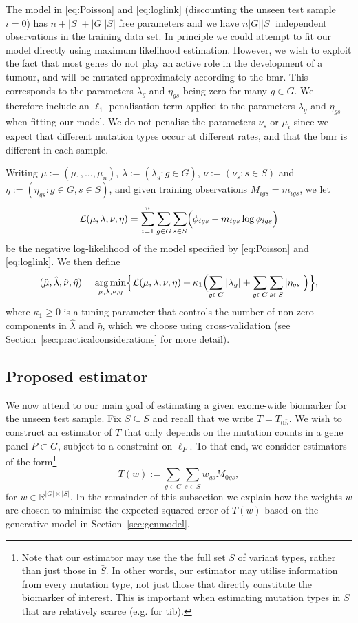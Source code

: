 \documentclass[../thesis.tex]{subfiles}
\begin{document}
The model in \eqref{eq:Poisson} and \eqref{eq:loglink} (discounting the unseen test sample $i=0$) has $n + |S| + |G||S|$ free parameters and we have $n|G||S|$ independent observations in the training data set. In principle we could attempt to fit our model directly using maximum likelihood estimation. However, we wish to exploit the fact that most genes do not play an active role in the development of a tumour, and will be mutated approximately according to the \gls{bmr}. This corresponds to the parameters $\lambda_g$ and $\eta_{gs}$ being zero for many $g \in G$. We therefore include an $\ell_1$-penalisation term applied to the parameters $\lambda_g$ and $\eta_{gs}$ when fitting our model. We do not penalise the parameters $\nu_s$ or $\mu_i$ {since we expect that different mutation types occur at different rates, and that the \gls{bmr} is different in each sample}. 

Writing $\mu := (\mu_1,\ldots, \mu_n)$, $\lambda := (\lambda_g :g \in G)$, $\nu := (\nu_s: s \in S)$ and $\eta := (\eta_{gs}: g\in G, s\in S)$, and given training observations $M_{igs} = m_{igs}$, we let
\[
\mathcal{L}(\mu, \lambda, \nu, \eta) = \sum_{i = 1}^n \sum_{g \in G} \sum_{s \in S} \Bigl( \phi_{igs} - m_{igs} \log \phi_{igs} \Bigr) 
\]
be the negative log-likelihood of the model specified by \eqref{eq:Poisson} and \eqref{eq:loglink}. We then define
\begin{equation}
(\hat{\mu}, \hat{\lambda}, \hat{\nu}, \hat{\eta}) = \operatorname*{arg\,min}_{\mu,\lambda, \nu, \eta} \Bigl\{ \mathcal{L}(\mu, \lambda, \nu, \eta) + \kappa_1 \Bigl(\sum_{g \in G} |\lambda_g|  +  \sum_{g \in G} \sum_{s \in S} |\eta_{gs}| \Bigr) \Bigr\},
\label{eq:genparams}
\end{equation}
where $\kappa_1 \geq 0$ is a tuning parameter that controls the number of non-zero components in $\hat{\lambda}$ and $\hat{\eta}$, which we choose using cross-validation (see Section~\ref{sec:practicalconsiderations} for more detail). 


\subsection{Proposed estimator \label{sec:linearestimator}}
We now attend to our main goal of estimating a given exome-wide biomarker for the unseen test sample. Fix $\bar{S} \subseteq S$ and recall that we write $T = T_{0\bar{S}}$. We wish to construct an estimator of $T$ that only depends on the mutation counts in a gene panel $P \subset G$, subject to a constraint on $\ell_P$. To that end, we consider estimators of the form\footnote{Note that our estimator may use the the full set $S$ of variant types, rather than just those in $\bar{S}$. In other words, our estimator may utilise information from every mutation type, not just those that directly constitute the biomarker of interest. This is important when estimating mutation types in $\bar{S}$ that are relatively scarce (e.g. for \gls{tib}).}
\[
T(w) := \sum_{g \in G} \sum_{s \in S} w_{gs}M_{0gs},
\]
for $w \in \mathbb{R}^{|G|\times |S|}$.  In the remainder of this subsection we explain how the weights $w$ are chosen to minimise the expected squared error of $T(w)$ based on the generative model in Section~\ref{sec:genmodel}. 
\end{document}
